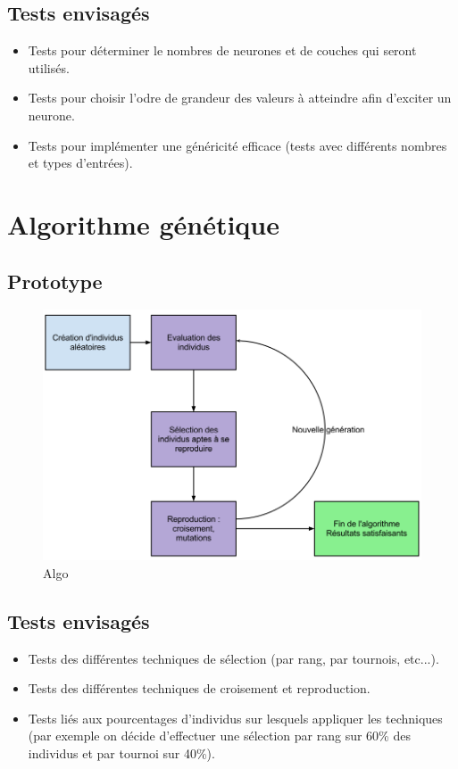 \subsection{Tests envisagés}

\begin{itemize}
  \item Tests pour déterminer le nombres de neurones et de couches qui seront utilisés.
  \item Tests pour choisir l'odre de grandeur des valeurs à atteindre afin d'exciter un neurone.
  \item Tests pour implémenter une généricité efficace (tests avec différents nombres et types d'entrées). \\

\end{itemize}

\section{Algorithme génétique}

\subsection{Prototype}
\begin{figure}[H]
    \centering
    \includegraphics[width=1\textwidth]{./pictures/algo_creatures.png}
    \caption{Algo }
\end{figure}


\subsection{Tests envisagés}
\begin{itemize}
  \item Tests des différentes techniques de sélection (par rang, par tournois, etc...).
  \item Tests des différentes techniques de croisement et reproduction.
  \item Tests liés aux pourcentages d'individus sur lesquels appliquer les techniques (par exemple on décide d'effectuer une sélection par rang sur 60\% des individus et par tournoi sur 40\%). \\

\end{itemize}

